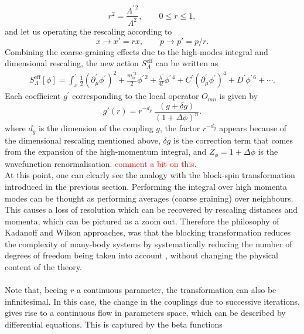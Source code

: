 \begin{equation*}
    r^2 = \frac{\Lambda^{\prime \, 2}}{\Lambda^2}, \qquad 0 \leq r \leq 1,
\end{equation*}
and let us operating the rescaling according to
\begin{equation*}
    x \to x' = rx, \qquad p \to p' = p/r.
\end{equation*}
Combining the coarse-graining effects due to the high-modes integral and dimensional rescaling, the new action $S^\text{eff}_\Lambda$ can be written as \cite{Peskin:1995ev}
\begin{equation*} 
    \begin{aligned} 
        S^\text{eff}_\Lambda[\phi]=\int_x^\prime \frac{1}{2}\left(\partial_\mu^{\prime} \phi^{\prime}\right)^2 + \frac{m_\phi^{\prime \, 2}}{2} \phi^{\prime \, 2}  + \frac{\lambda^\prime}{4 !} \phi^{\prime \, 4}+C^{\prime}\left(\partial_\mu^{\prime} \phi^{\prime}\right)^4+D^{\prime} \phi^{\prime \, 6}+\cdots.
    \end{aligned}
\end{equation*}
Each coefficient $g^\prime$ corresponding to the local operator $O_{mn}$ is given by
\begin{equation}
    g'(r) = r^{-d_g} \ \frac{(g + \delta g)}{(1 + \Delta\phi)^{n}}.
    \label{eq:couplings_redefinition}
\end{equation}
where $d_g$ is the dimension of the coupling $g$, the factor  $r^{-d_g}$ appears because of the dimensional rescaling mentioned above, $\delta g$ is the correction term that comes from the expansion of the high-momentum integral, and $Z_\phi = 1 + \Delta\phi$ is the wavefunction renormalisation. \textcolor{red}{comment a bit on this}. \\
At this point, one can clearly see the analogy with the block-spin transformation introduced in the previous section. Performing the integral over high momenta modes can be thought as performing averages (coarse graining) over neighbours. This causes a loss of resolution which can be recovered by rescaling distances and momenta, which can be pictured as a zoom out.
Therefore the philosophy of Kadanoff and Wilson approaches, was that the blocking transformation reduces the complexity of many-body
systems by systematically reducing the number of degrees of freedom being taken into account \cite{WILSON197475},
without changing the physical content of the theory. \\~\\
Note that, beeing $r$ a continuous parameter, the transformation can also be infinitesimal. In this case, the change in the couplings due to successive iterations, gives rise to a continuous flow in parameters space, which can be described by differential equations. This is captured by the beta functions 
